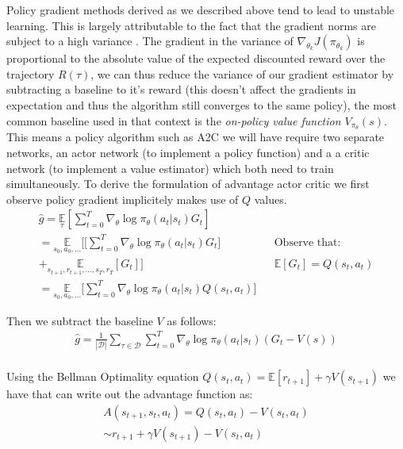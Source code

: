 Policy gradient methods derived as we described above tend to lead to unstable learning. 
This is largely attributable to the fact that the gradient norms are subject to a high variance \cite{Konda00actor-criticalgorithms}.
The gradient in the variance of $\nabla_{\theta_k} J(\pi_{\theta_k})$ is proportional to the absolute value of the expected discounted reward over the trajectory $R(\tau)$, we can thus reduce the variance of our gradient estimator by subtracting a baseline to it's reward (this doesn't affect the gradients in expectation and thus the algorithm still converges to the same policy), the most common baseline used in that context is the \textit{on-policy value function $V_{\pi_\theta}(s)$}. 
This means a policy algorithm such as A2C we will have require two separate networks, an actor network (to implement a policy function) and a a critic network (to implement a value estimator) which both need to train simultaneously. To derive the formulation of advantage actor critic we first observe policy gradient implicitely makes use of $Q$ values.\\

\begin{align*}
    \hat{g} = \underset{\tau}{\mathbb{E}} \left[ \sum_{t=0}^{T} \nabla_\theta \log \pi_\theta (a_t|s_t) G_t \right] && \text{}\\
    = \underset{s_0,a_0,...}{\mathbb{E}} \bigg[ \big[ \sum_{t=0}^{T} \nabla_\theta \log \pi_\theta (a_t|s_t) G_t \big] && \text{Observe that:}\\
    + \underset{s_{t+1},r_{t+1},...,s_{T},r_{T}}{\mathbb{E}} [G_t] \bigg] && \mathbb{E} [G_t] = Q(s_t,a_t)\\
    = \underset{s_0,a_0,...}{\mathbb{E}} \bigg[ \sum_{t=0}^{T} \nabla_\theta \log \pi_\theta (a_t|s_t) Q(s_t,a_t) \bigg] && 
\end{align*}

Then we subtract the baseline $V$ as follows:
\begin{align*}
    \hat{g} = \frac{1}{|\mathcal{D}|} \sum_{\tau \in \mathcal{D}} \sum_{t=0}^{T} \nabla_\theta \log \pi_\theta (a_t|s_t) (G_t-V(s))\\
\end{align*}

Using the Bellman Optimality equation $Q(s_t,a_t) = \mathbb{E}[r_{t+1}] + \gamma V(s_{t+1})$ we have that can write out the advantage function as:
\begin{align*}
    A(s_{t+1},s_t,a_t) = Q(s_t,a_t) - V(s_t,a_t) \\
   \sim r_{t+1} + \gamma V(s_{t+1}) - V(s_t,a_t) 
\end{align*}

